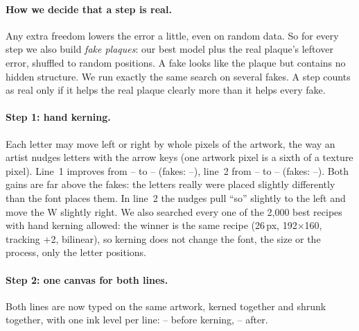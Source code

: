 \documentclass[10pt,a4paper]{article}
\providecommand{\NgOneRigid}{--}\providecommand{\NgOneKern}{--}\providecommand{\NgOneGain}{--}\providecommand{\NgOneNoise}{--}\providecommand{\NgTwoRigid}{--}\providecommand{\NgTwoKern}{--}\providecommand{\NgTwoGain}{--}\providecommand{\NgTwoNoise}{--}\providecommand{\DzPlain}{--}\providecommand{\DzKern}{--}\providecommand{\DzNormal}{--}\providecommand{\DzScreen}{--}\providecommand{\DzLighten}{--}\providecommand{\DzBlendGain}{--}\providecommand{\DzBlendNoise}{--}\providecommand{\DzShadowGain}{--}\providecommand{\DzShadowNoise}{--}\providecommand{\DzEmbossGain}{--}\providecommand{\DzEmbossNoise}{--}\providecommand{\DzOutlineGain}{--}\providecommand{\DzOutlineNoise}{--}\providecommand{\DzSharpenGain}{--}\providecommand{\DzSharpenNoise}{--}\providecommand{\DzLineGain}{--}\providecommand{\DzLineNoise}{--}\providecommand{\DzScaleInt}{--}\providecommand{\DzScaleBest}{--}\providecommand{\DzScaleW}{--}\providecommand{\DzScaleH}{--}\providecommand{\DzScaleGain}{--}\providecommand{\DzScaleNoise}{--}
\newcommand{\q}[1]{``#1''}
\begin{document}
\paragraph{How we decide that a step is real.}
Any extra freedom lowers the error a little, even on random data. So for every step we also build \emph{fake
plaques}: our best model plus the real plaque's leftover error, shuffled to random positions. A fake looks like the
plaque but contains no hidden structure. We run exactly the same search on several fakes. A step counts as real only
if it helps the real plaque clearly more than it helps every fake.

\paragraph{Step 1: hand kerning.}
Each letter may move left or right by whole pixels of the artwork, the way an artist nudges letters with the arrow
keys (one artwork pixel is a sixth of a texture pixel). Line~1 improves from \NgOneRigid{} to \NgOneKern{} (fakes:
\NgOneNoise), line~2 from \NgTwoRigid{} to \NgTwoKern{} (fakes: \NgTwoNoise). Both gains are far above the fakes:
the letters really were placed slightly differently than the font places them. In line~2 the nudges pull \q{so}
slightly to the left and move the W slightly right. We also searched every one of the 2{,}000 best recipes with
hand kerning allowed: the winner is the same recipe (26\,px, 192$\times$160, tracking +2, bilinear), so kerning does
not change the font, the size or the process, only the letter positions.

\paragraph{Step 2: one canvas for both lines.}
Both lines are now typed on the same artwork, kerned together and shrunk together, with one ink level per line:
\DzPlain{} before kerning, \DzKern{} after.
\end{document}
